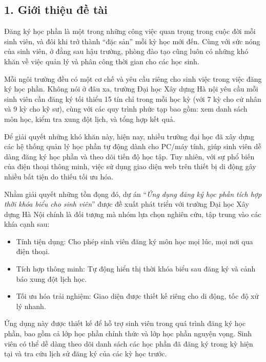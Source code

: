 \documentclass[../main.tex]{subfiles}
\begin{document}
\subsection*{1. Giới thiệu đề tài}

Đăng ký học phần là một trong những công việc quan trọng trong cuộc đời mỗi sinh viên, và đôi khi trở thành ``đặc sản'' mỗi kỳ học mới đến. Cùng với sức nóng của sinh viên, ở đằng sau hậu trường, phòng đào tạo cũng luôn có những khó khăn về việc quản lý và phân công thời gian cho các học sinh.

Mỗi ngôi trường đều có một cơ chế và yêu cầu riêng cho sinh việc trong việc đăng ký học phần. Không nói ở đâu xa, trường Đại học Xây dựng Hà nội yêu cầu mỗi sinh viên cần đăng ký tối thiểu 15 tín chỉ trong mỗi học kỳ (với 7 kỳ cho cử nhân và 9 kỳ cho kỹ sư), cùng với các quy trình phức tạp bao gồm: xem danh sách môn học, kiểm tra xung đột lịch, và tổng hợp kết quả. 

Để giải quyết những khó khăn này, hiện nay, nhiều trường đại học đã xây dựng các hệ thống quản lý học phần tự động dành cho PC/máy tính, giúp sinh viên dễ dàng đăng ký học phần và theo dõi tiến độ học tập. Tuy nhiên, với sự phổ biến của điện thoại thông minh, việc sử dụng giao diện web trên thiết bị di động gây nhiều bất tiện do thiếu tối ưu hóa.

Nhằm giải quyết những tồn đọng đó, dự án ``\emph{Ứng dụng đăng ký học phần tích hợp thời khóa biểu cho sinh viên}'' được đề xuất phát triển với trường Đại học Xây dựng Hà Nội chính là đối tượng mà nhóm lựa chọn nghiên cứu, tập trung vào các khía cạnh sau:

\begin{itemize}
    \item Tính tiện dụng: Cho phép sinh viên đăng ký môn học mọi lúc, mọi nơi qua điện thoại.
    \item Tích hợp thông minh: Tự động hiển thị thời khóa biểu sau đăng ký và cảnh báo xung đột lịch học.
    \item Tối ưu hóa trải nghiệm: Giao diện được thiết kế riêng cho di động, tốc độ xử lý nhanh.
\end{itemize}

Ứng dụng này được thiết kế để hỗ trợ sinh viên trong quá trình đăng ký học phần, bao gồm cả lớp học phần chính thức và lớp học phần nguyện vọng. Sinh viên có thể dễ dàng theo dõi danh sách các học phần đã đăng ký trong kỳ hiện tại và tra cứu lịch sử đăng ký của các kỳ học trước.
\end{document}
